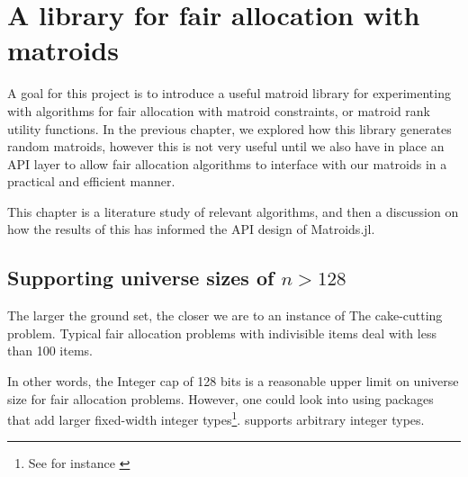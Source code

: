 \chapter{A library for fair allocation with matroids}
A goal for this project is to introduce a useful matroid library for experimenting with algorithms for fair allocation with matroid constraints, or matroid rank utility functions. In the previous chapter, we explored how this library generates random matroids, however this is not very useful until we also have in place an API layer to allow fair allocation algorithms to interface with our matroids in a practical and efficient manner.

This chapter is a literature study of relevant algorithms, and then a discussion on how the results of this has informed the API design of Matroids.jl.

\skelpars[12]


\section{Supporting universe sizes of \texorpdfstring{$n > 128$}{n > 128}}
The larger the ground set, the closer we are to an instance of The cake-cutting problem. Typical fair allocation problems with indivisible items deal with less than 100 items. 

In other words, the Integer cap of 128 bits is a reasonable upper limit on universe size for fair allocation problems. However, one could look into using packages that add larger fixed-width integer types\footnote{See for instance \href{https://github.com/rfourquet/BitIntegers.jl}{}}.  supports arbitrary integer types. 